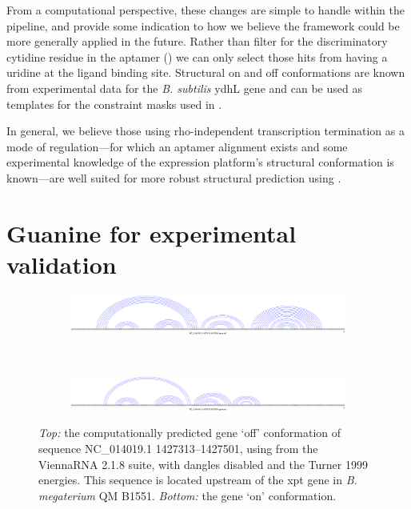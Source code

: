 From a computational perspective, these changes are simple to handle within the
\rfinder pipeline, and provide some indication to how we believe the framework
could be more generally applied in the future. Rather than filter for the
discriminatory cytidine residue in the \rb aptamer () we can only select those hits from \infernal having a uridine at the
ligand binding site. Structural on and off conformations are known from
experimental data for the {\em B. subtilis} ydhL gene \citep{mandal2004a} and can
be used as templates for the constraint masks used in .

In general, we believe those \rbs using rho-independent transcription
termination as a mode of regulation---for which an aptamer alignment exists and
some experimental knowledge of the expression platform's structural
conformation is known---are well suited for more robust structural
prediction using \rfinder.

\section{Guanine \rbs for experimental validation}
\label{sec:rfinder:grbValidationVarna}

\begin{figure}[!ht]
\centering
\begin{subfigure}[h]{\textwidth}
\centering
\includegraphics[width=.9\textwidth]{Figures/Ribofinder/NC_014019_1_1427313_1427501_OFF.pdf}
\end{subfigure} \\
\medskip
\begin{subfigure}[h]{\textwidth}
\centering
\includegraphics[width=.9\textwidth]{Figures/Ribofinder/NC_014019_1_1427313_1427501_ON.pdf}
\end{subfigure}
\caption[Structures for the putative \rb located upstream of the xpt gene in {\em B. megaterium} QM B1551]{{\em Top:} the computationally predicted gene `off' conformation of
sequence NC\_014019.1 1427313--1427501, using \rfold from the ViennaRNA 2.1.8
suite, with dangles disabled and the Turner 1999 energies. This sequence is
located upstream of the xpt gene in {\em B. megaterium} QM B1551. {\em Bottom:}
the gene `on' conformation.}
\label{fig:figure:NC_014019_1_1427313_1427501}
\end{figure}
\medskip

